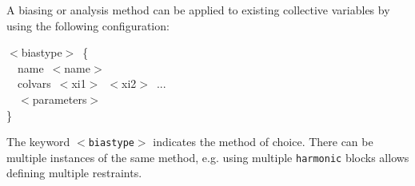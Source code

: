
A biasing or analysis method can be applied to existing collective variables by using the following configuration:

\begin{cvexampleinput}
\-$<$biastype$>$~\{\\
\-~~name~$<$name$>$ \\
\-~~colvars~$<$xi1$>$~$<$xi2$>$~...\\
\-~~$<$parameters$>$\\
\}
\end{cvexampleinput}

\noindent{}The keyword \texttt{$<$biastype$>$} indicates the method of choice.
There can be multiple instances of the same method, e.g.{} using multiple \texttt{harmonic} blocks allows defining multiple restraints.

